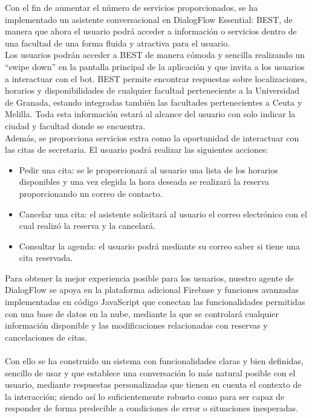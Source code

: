 \documentclass[11pt,a4paper]{article}
\begin{document}
Con el fin de aumentar el número de servicios proporcionados, se ha implementado un asistente conversacional en DialogFlow Essential: BEST, de manera que ahora el usuario podrá acceder a información o servicios dentro de una facultad de una forma fluida y atractiva para el usuario.\\


Los usuarios podrán acceder a BEST de manera cómoda y sencilla realizando un “swipe down” en la pantalla principal de la aplicación y que invita a los usuarios a interactuar con el bot. BEST permite encontrar respuestas sobre localizaciones, horarios y disponibilidades de cualquier facultad perteneciente a la Universidad de Granada, estando integradas también las facultades pertenecientes a Ceuta y Melilla. Toda esta información estará al alcance del usuario con solo indicar la ciudad y facultad donde se encuentra.\\


Además, se proporciona servicios extra como la oportunidad de interactuar con las citas de secretaria. El usuario podrá realizar las siguientes acciones:

\begin{itemize}
  \item Pedir una cita: se le proporcionará al usuario una lista de los horarios disponibles y una vez elegida la hora deseada se realizará la reserva proporcionando un correo de contacto.
  \item Cancelar una cita: el asistente solicitará al usuario el correo electrónico con el cual realizó la reserva y la cancelará.
  \item Consultar la agenda: el usuario podrá mediante su correo saber si tiene una cita reservada.
\end{itemize}


Para obtener la mejor experiencia posible para los usuarios, nuestro agente de DialogFlow se apoya en la plataforma adicional Firebase y funciones avanzadas implementadas en código JavaScript que conectan las funcionalidades permitidas con una base de datos en la nube, mediante la que se controlará cualquier información disponible y las modificaciones relacionadas con reservas y cancelaciones de citas.\\\\


Con ello se ha construido un sistema con funcionalidades claras y bien definidas, sencillo de usar y que establece una conversación lo más natural posible con el usuario, mediante respuestas personalizadas que tienen en cuenta el contexto de la interacción; siendo así lo suficientemente robusto como para ser capaz de responder de forma predecible a condiciones de error o situaciones inesperadas.\\
\end{document}
